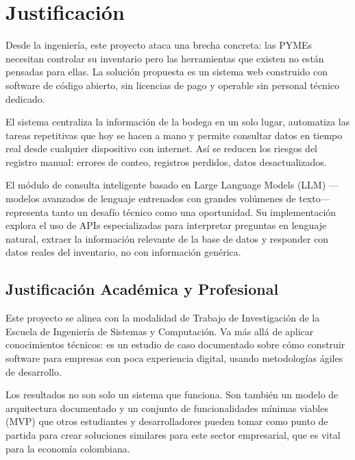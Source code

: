 

\section{Justificación}

Desde la ingeniería, este proyecto ataca una brecha concreta: las PYMEs necesitan controlar su inventario pero las herramientas que existen no están pensadas para ellas. La solución propuesta es un sistema web construido con software de código abierto, sin licencias de pago y operable sin personal técnico dedicado.

El sistema centraliza la información de la bodega en un solo lugar, automatiza las tareas repetitivas que hoy se hacen a mano y permite consultar datos en tiempo real desde cualquier dispositivo con internet. Así se reducen los riesgos del registro manual: errores de conteo, registros perdidos, datos desactualizados.

El módulo de consulta inteligente basado en Large Language Models (LLM) ---modelos avanzados de lenguaje entrenados con grandes volúmenes de texto--- representa tanto un desafío técnico como una oportunidad. Su implementación explora el uso de APIs especializadas para interpretar preguntas en lenguaje natural, extraer la información relevante de la base de datos y responder con datos reales del inventario, no con información genérica.


\subsection{Justificación Académica y Profesional}
\label{sec:just_academica}

Este proyecto se alinea con la modalidad de Trabajo de Investigación de la Escuela de Ingeniería de Sistemas y Computación. Va más allá de aplicar conocimientos técnicos: es un estudio de caso documentado sobre cómo construir software para empresas con poca experiencia digital, usando metodologías ágiles de desarrollo.

Los resultados no son solo un sistema que funciona. Son también un modelo de arquitectura documentado y un conjunto de funcionalidades mínimas viables (MVP) que otros estudiantes y desarrolladores pueden tomar como punto de partida para crear soluciones similares para este sector empresarial, que es vital para la economía colombiana.


